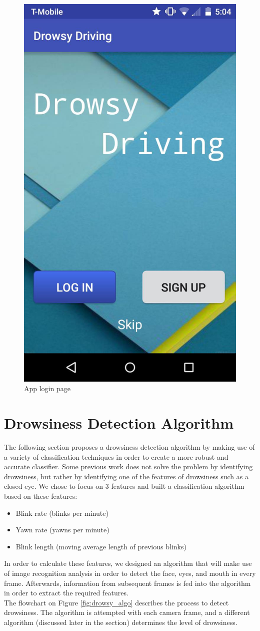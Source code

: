 \documentclass[twocolumn]{article}
\begin{document}
\begin{figure}[H]
\centering
\includegraphics[width=0.6\linewidth]{./logo.jpg}
\caption{App login page }
\label{fig:app}
\end{figure}

\section{Drowsiness Detection Algorithm}
The following section proposes a drowsiness detection algorithm by making use of a variety of classification techniques in order to create a more robust and accurate classifier. Some previous work \cite{pakistan} does not solve the problem by identifying drowsiness, but rather by identifying one of the features of drowsiness such as a closed eye. We chose to focus on 3 features and built a classification algorithm based on these features:
\begin{itemize}
\item Blink rate (blinks per minute)
\item Yawn rate (yawns per minute)
\item Blink length (moving average length of previous blinks)
\end{itemize}
In order to calculate these features, we designed an algorithm that will make use of image recognition analysis in order to detect the face, eyes, and mouth in every frame. Afterwards, information from subsequent frames is fed into the algorithm in order to extract the required features. \\
The flowchart on Figure \ref{fig:drowsy_algo} describes the process to detect drowsiness. The algorithm is attempted with each camera frame, and a different algorithm (discussed later in the section) determines the level of drowsiness. \\
\end{document}
